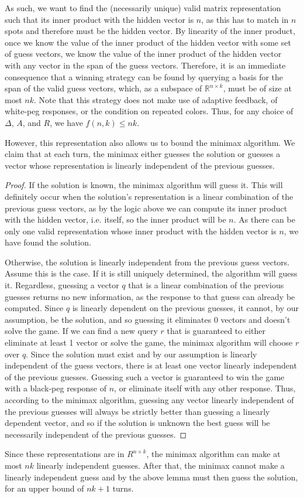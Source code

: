 \documentclass[12pt, a4paper]{article}
\newcommand{\R}{\mathbb{R}}           %
\begin{document}
As such, we want to find the (necessarily unique) valid matrix representation such that its inner product with the hidden vector is $n$, as this has to match in $n$ spots and therefore must be the hidden vector. By linearity of the inner product, once we know the value of the inner product of the hidden vector with some set of guess vectors, we know the value of the inner product of the hidden vector with any vector in the span of the guess vectors. Therefore, it is an immediate consequence that a winning strategy can be found by querying a basis for the span of the valid guess vectors, which, as a subspace of $\R^{n\times k}$, must be of size at most $nk$. Note that this strategy does not make use of adaptive feedback, of white-peg responses, or the condition on repeated colors. Thus, for any choice of $\Delta$, $A$, and $R$, we have $f(n,k) \leq nk$.

However, this representation also allows us to bound the minimax algorithm. We claim that at each turn, the minimax either guesses the solution or guesses a vector whose representation is linearly independent of the previous guesses. 
\begin{proof}
	If the solution is known, the minimax algorithm will guess it. This will definitely occur when the solution's representation is a linear combination of the previous guess vectors, as by the logic above we can compute its inner product with the hidden vector, i.e. itself, so the inner product will be $n$. As there can be only one valid representation whose inner product with the hidden vector is $n$, we have found the solution.
	
	Otherwise, the solution is linearly independent from the previous guess vectors. Assume this is the case. If it is still uniquely determined, the algorithm will guess it. Regardless, guessing a vector $q$ that is a linear combination of the previous guesses returns no new information, as the response to that guess can already be computed. Since $q$ is linearly dependent on the previous guesses, it cannot, by our assumption, be the solution, and so guessing it eliminates 0 vectors and doesn't solve the game. If we can find a new query $r$ that is guaranteed to either eliminate at least 1 vector or solve the game, the minimax algorithm will choose $r$ over $q$. Since the solution must exist and by our assumption is linearly independent of the guess vectors, there is at least one vector linearly independent of the previous guesses. Guessing such a vector is guaranteed to win the game with a black-peg response of $n$, or eliminate itself with any other response. Thus, according to the minimax algorithm, guessing any vector linearly independent of the previous guesses will always be strictly better than guessing a linearly dependent vector, and so if the solution is unknown the best guess will be necessarily independent of the previous guesses.
\end{proof}
Since these representations are in $R^{n \times k}$, the minimax algorithm can make at most $nk$ linearly independent guesses. After that, the minimax cannot make a linearly independent guess and by the above lemma must then guess the solution, for an upper bound of $nk+1$ turns.
\end{document}
